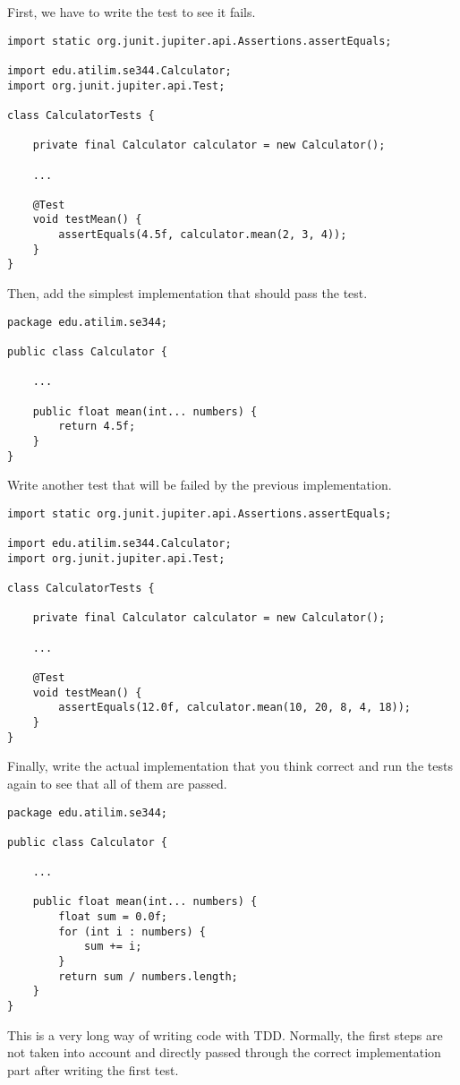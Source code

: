 \begin{solution}
    First, we have to write the test to see it fails.
    \begin{lstlisting}
import static org.junit.jupiter.api.Assertions.assertEquals;

import edu.atilim.se344.Calculator;
import org.junit.jupiter.api.Test;

class CalculatorTests {

    private final Calculator calculator = new Calculator();

    ...
    
    @Test
    void testMean() {
        assertEquals(4.5f, calculator.mean(2, 3, 4));
    }
}
    \end{lstlisting}
    Then, add the simplest implementation that should pass the test.
    \begin{lstlisting}
package edu.atilim.se344;

public class Calculator {
    
    ...
    
    public float mean(int... numbers) {
        return 4.5f;
    }
}
    \end{lstlisting}
    Write another test that will be failed by the previous implementation.
    \begin{lstlisting}
import static org.junit.jupiter.api.Assertions.assertEquals;

import edu.atilim.se344.Calculator;
import org.junit.jupiter.api.Test;

class CalculatorTests {

    private final Calculator calculator = new Calculator();

    ...
    
    @Test
    void testMean() {
        assertEquals(12.0f, calculator.mean(10, 20, 8, 4, 18));
    }
}
    \end{lstlisting}
    Finally, write the actual implementation that you think correct and run the tests again to see that all of them are passed.
    \begin{lstlisting}
package edu.atilim.se344;

public class Calculator {
    
    ...
    
    public float mean(int... numbers) {
        float sum = 0.0f;
        for (int i : numbers) {
            sum += i;
        }
        return sum / numbers.length;
    }
}
    \end{lstlisting}
    This is a very long way of writing code with TDD. Normally, the first steps are not taken into account and directly passed through the correct implementation part after writing the first test.
\end{solution}

